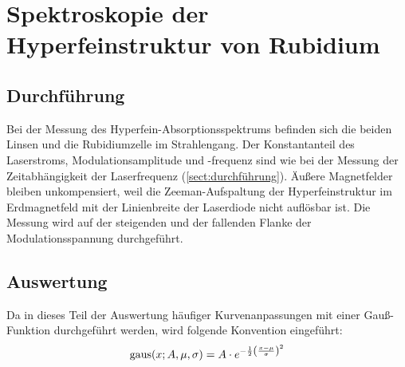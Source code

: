 \section{Spektroskopie der Hyperfeinstruktur von Rubidium}
\subsection{Durchführung}
Bei der Messung des Hyperfein-Absorptionsspektrums befinden sich die beiden Linsen und
die Rubidiumzelle im Strahlengang.
Der Konstantanteil des Laserstroms, Modulationsamplitude und -frequenz
sind wie bei der Messung der Zeitabhängigkeit der Laserfrequenz (\autoref{sect:durchführung}).
Äußere Magnetfelder bleiben unkompensiert, weil die Zeeman-Aufspaltung der Hyperfeinstruktur im Erdmagnetfeld
mit der Linienbreite der Laserdiode nicht auflösbar ist.
Die Messung wird auf der steigenden und der fallenden Flanke der Modulationsspannung durchgeführt.


\subsection{Auswertung}
Da in dieses Teil der Auswertung häufiger Kurvenanpassungen mit einer Gauß-Funktion durchgeführt werden, wird folgende Konvention eingeführt:
\begin{equation}
    \label{eq:convention:gauss}
    \operatorname{gaus}(x; A, \mu, \sigma) = A \cdot e^{-\frac{1}{2} \left( \frac{x-\mu}{\sigma} \right)^2}
\end{equation}
